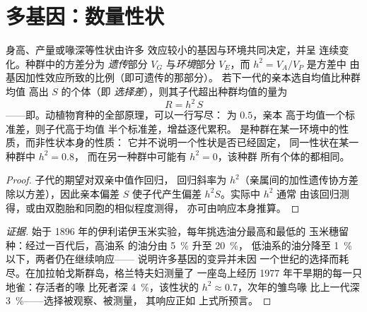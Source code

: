 \section{多基因：数量性状}

\begin{theorem}[遗传力与选择响应]\label{thm:b2:population-genetics:heritability}
身高、产量或喙深等性状由许多
效应较小的基因与环境共同决定，并呈
连续变化。种群中的方差分为
\emph{遗传}部分 $V_G$ 与\emph{环境}部分 $V_E$，而
\emph{} $h^{2} = V_A/V_P$ 是方差中
由基因加性效应所致的比例（即可遗传的那部分）。
若下一代的亲本选自均值比种群均值
高出 $S$ 的个体（即
\emph{选择差}），则其子代超出种群均值的量为
\[
R = h^{2}\,S
\]
——即\emph{}。动植物育种的全部原理，可以一行写尽：
为 $0.5$，亲本
高于均值一个标准差，则子代高于均值
半个标准差，增益逐代累积。
是种群在某一环境中的性质，而非性状本身的性质：
它并不说明一个性状是否已经固定，
同一性状在某一种群中 $h^{2} = 0.8$，
而在另一种群中可能有 $h^{2} = 0$，该种群
所有个体的都相同。
\end{theorem}
\begin{proof}
子代的期望对双亲中值作回归，
回归斜率为 $h^{2}$（亲属间的加性遗传协方差
除以方差），因此亲本偏差 $S$
使子代产生偏差 $h^{2}S$。实际中 $h^{2}$ 通常
由该回归测得，或由双胞胎和同胞的相似程度测得，
亦可由响应本身推算。
\end{proof}
\begin{proof}[证据]
始于 1896 年的伊利诺伊玉米实验，每年挑选油分最高和最低的
玉米穗留种：经过一百代后，高油系
的油分由 \qty{5}{\%} 升至 \qty{20}{\%}，
低油系的油分降至 \qty{1}{\%} 以下，两者仍在继续响应——
说明许多基因的变异并未因
一个世纪的选择而耗尽。在加拉帕戈斯群岛，格兰特夫妇测量了
一座岛上经历 1977 年干旱期的每一只地雀：存活者的喙
比死者深 \qty{4}{\%}，该性状的 $h^{2}
\approx 0.7$，次年的雏鸟喙
比上一代深 \qty{3}{\%}——选择被观察、被测量，
其响应正如
上式所预言。
\end{proof}

